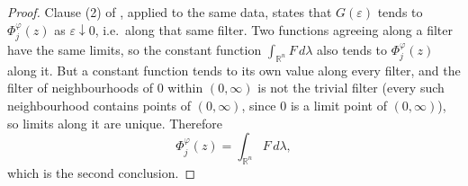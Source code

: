 \begin{proof}
Clause (2) of , applied to the same data, states that $G(\varepsilon)$
tends to $\Phi_j^\varphi(z)$ as $\varepsilon \downarrow 0$, i.e.\ along that same filter.  Two
functions agreeing along a filter have the same limits, so the constant function
$\int_{\mathbb{R}^n}F\,d\lambda$ also tends to $\Phi_j^\varphi(z)$ along it.  But a constant
function tends to its own value along every filter, and the filter of neighbourhoods of $0$
within $(0,\infty)$ is not the trivial filter (every such neighbourhood contains points of
$(0,\infty)$, since $0$ is a limit point of $(0,\infty)$), so limits along it are unique.
Therefore
\[
  \Phi_j^\varphi(z) = \int_{\mathbb{R}^n}F\,d\lambda ,
\]
which is the second conclusion.
\end{proof}
